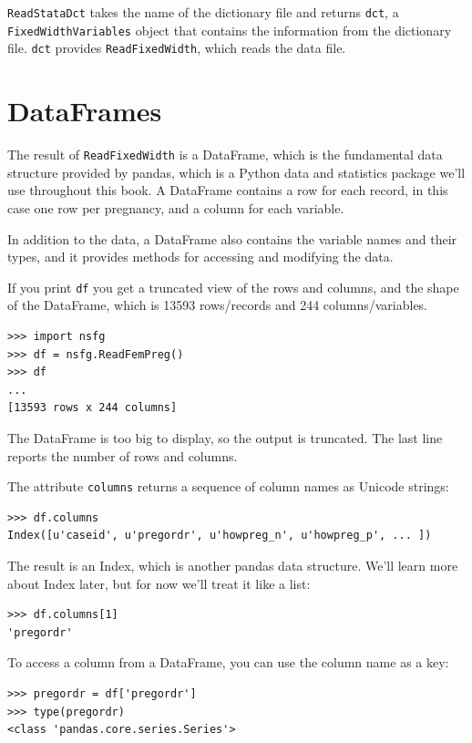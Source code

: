 \documentclass[12pt]{book}
\begin{document}
\verb"ReadStataDct" takes the name of the dictionary file
and returns \verb"dct", a \verb"FixedWidthVariables" object that contains the
information from the dictionary file.  \verb"dct" provides
\verb"ReadFixedWidth", which reads the data file.


\section{DataFrames}
\label{dataframe}

The result of \verb"ReadFixedWidth" is a DataFrame, which is the
fundamental data structure provided by pandas, which is a Python
data and statistics package we'll use throughout this book.
A DataFrame contains a
row for each record, in this case one row per pregnancy, and a column
for each variable.

In addition to the data, a DataFrame also contains the variable
names and their types, and it provides methods for accessing and modifying
the data.

If you print \verb"df" you get a truncated view of the rows and
columns, and the shape of the DataFrame, which is 13593
rows/records and 244 columns/variables.

\begin{verbatim}
>>> import nsfg
>>> df = nsfg.ReadFemPreg()
>>> df
...
[13593 rows x 244 columns]
\end{verbatim}

The DataFrame is too big to display, so the output is truncated.  The
last line reports the number of rows and columns.

The attribute \verb"columns" returns a sequence of column
names as Unicode strings:

\begin{verbatim}
>>> df.columns
Index([u'caseid', u'pregordr', u'howpreg_n', u'howpreg_p', ... ])
\end{verbatim}

The result is an Index, which is another pandas data structure.  
We'll learn more about Index later, but for
now we'll treat it like a list:

\begin{verbatim}
>>> df.columns[1]
'pregordr'
\end{verbatim}

To access a column from a DataFrame, you can use the column
name as a key:

\begin{verbatim}
>>> pregordr = df['pregordr']
>>> type(pregordr)
<class 'pandas.core.series.Series'>
\end{verbatim}
\end{document}
